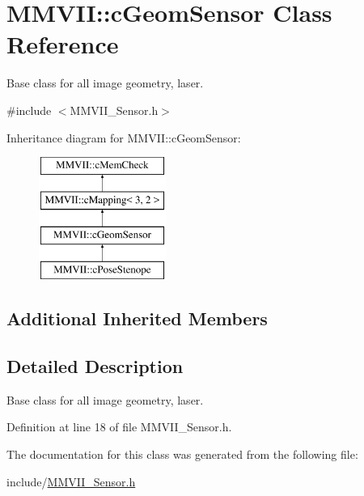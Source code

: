 \hypertarget{classMMVII_1_1cGeomSensor}{}\section{M\+M\+V\+II\+:\+:c\+Geom\+Sensor Class Reference}
\label{classMMVII_1_1cGeomSensor}


Base class for all image geometry, laser.  




{\ttfamily \#include $<$M\+M\+V\+I\+I\+\_\+\+Sensor.\+h$>$}

Inheritance diagram for M\+M\+V\+II\+:\+:c\+Geom\+Sensor\+:\begin{figure}[H]
\begin{center}
\leavevmode
\includegraphics[height=4.000000cm]{classMMVII_1_1cGeomSensor}
\end{center}
\end{figure}
\subsection*{Additional Inherited Members}


\subsection{Detailed Description}
Base class for all image geometry, laser. 

Definition at line 18 of file M\+M\+V\+I\+I\+\_\+\+Sensor.\+h.



The documentation for this class was generated from the following file\+:\begin{DoxyCompactItemize}
\item 
include/\hyperlink{MMVII__Sensor_8h}{M\+M\+V\+I\+I\+\_\+\+Sensor.\+h}\end{DoxyCompactItemize}
